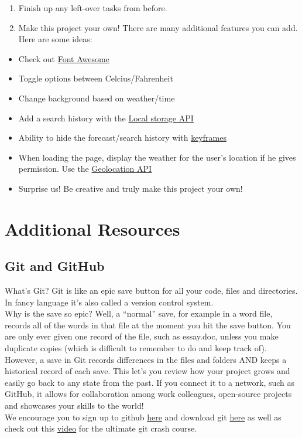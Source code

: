 \documentclass[
]{book}
\providecommand{\tightlist}{%
  \setlength{\itemsep}{0pt}\setlength{\parskip}{0pt}}
\begin{document}
\begin{enumerate}
\def\labelenumi{\arabic{enumi}.}
\tightlist
\item
  Finish up any left-over tasks from before.
\item
  Make this project your own! There are many additional features you can add. Here are some ideas:
\end{enumerate}

\begin{itemize}
\tightlist
\item
  Check out \protect\hyperlink{font-awesome}{Font Awesome}
\item
  Toggle options between Celcius/Fahrenheit
\item
  Change background based on weather/time
\item
  Add a search history with the \href{https://developer.mozilla.org/de/docs/Web/API/Window/localStorage}{Local storage API}
\item
  Ability to hide the forecast/search history with \href{https://developer.mozilla.org/de/docs/Web/CSS/@keyframes}{keyframes}
\item
  When loading the page, display the weather for the user's location if he gives permission. Use the \href{https://developer.mozilla.org/de/docs/Web/API/Geolocation_API}{Geolocation API}
\item
  Surprise us! Be creative and truly make this project your own!
\end{itemize}

\hypertarget{additional-resources}{%
\chapter{Additional Resources}\label{additional-resources}}

\hypertarget{git-and-github}{%
\section{Git and GitHub}\label{git-and-github}}

What's Git? Git is like an epic save button for all your code, files and directories. In fancy language it's also called a version control system.\\
Why is the save so epic? Well, a ``normal'' save, for example in a word file, records all of the words in that file at the moment you hit the save button. You are only ever given one record of the file, such as essay.doc, unless you make duplicate copies (which is difficult to remember to do and keep track of).\\
However, a save in Git records differences in the files and folders AND keeps a historical record of each save. This let's you review how your project grows and easily go back to any state from the past. If you connect it to a network, such as GitHub, it allows for collaboration among work colleagues, open-source projects and showcases your skills to the world!\\
We encourage you to sign up to github \href{https://github.com/}{here} and download git \href{https://git-scm.com/downloads}{here} as well as check out this \href{https://www.youtube.com/watch?v=SWYqp7iY_Tc}{video} for the ultimate git crash course.
\end{document}
